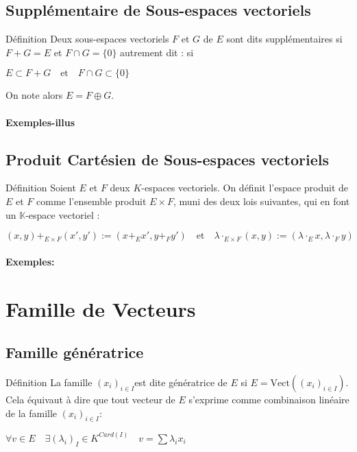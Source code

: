 \documentclass{book}
\begin{document}
\subsection{Supplémentaire de Sous-espaces vectoriels}
\begin{Définition}[]{Définition}{}
Deux sous-espaces vectoriels ${\displaystyle F}$ et ${\displaystyle G}$ de ${\displaystyle E}$ sont dits supplémentaires si ${\displaystyle F+G=E}$ et ${\displaystyle F\cap G=\{0\}}$ autrement dit : si

${\displaystyle E\subset F+G\quad {\text{et}}\quad F\cap G\subset \{0\}}$

On note alors ${\displaystyle E=F\oplus G}.$
\end{Définition}
\paragraph{Exemples-illus}
\subsection{Produit Cartésien de Sous-espaces vectoriels}
\begin{Définition}[]{Définition}{}
Soient ${\displaystyle E}$ et ${\displaystyle F}$ deux ${\displaystyle K}$-espaces vectoriels. 
\newline
On définit l'espace produit de ${\displaystyle E}$ et ${\displaystyle F}$ comme l'ensemble produit ${\displaystyle E\times F}$, muni des deux lois suivantes, qui en font un ${\displaystyle \mathbb{K}}$-espace vectoriel :

${\displaystyle (x,y)+_{E\times F}(x',y'):=(x+_{E}x',y+_{F}y')\quad {\text{et}}\quad \lambda \cdot _{E\times F}(x,y):=(\lambda \cdot _{E}x,\lambda \cdot _{F}y)}$
\end{Définition}
\paragraph{Exemples:}
\section{Famille de Vecteurs}
\subsection{Famille génératrice}
\begin{Définition}[]{Définition}{}
La famille ${\displaystyle (x_{i})_{i\in I}} $est dite génératrice de ${\displaystyle E}$ si
${\displaystyle E=\mathrm {Vect} \left((x_{i})_{i\in I}\right)}$.
Cela équivaut à dire que tout vecteur de ${\displaystyle E}$ s'exprime  comme combinaison linéaire de la famille ${\displaystyle (x_{i})_{i\in I}}$:
\begin{framed}
${\displaystyle \forall v\in E\quad \exists (\lambda _{i})_{I}\in K^{Card(I)} \quad v=\sum \lambda _{i}x_{i}}$
\end{framed}
\end{Définition}
\end{document}
